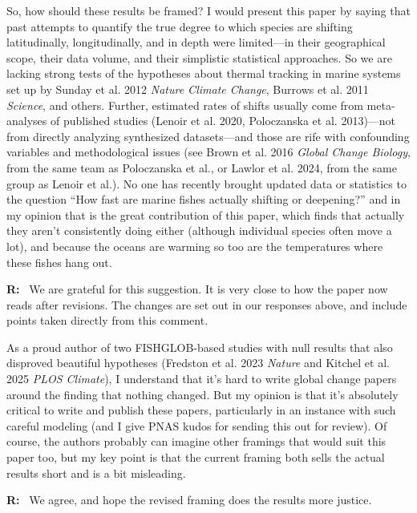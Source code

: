 \documentclass[11pt]{article}
\newcommand{\reviewer}[1]{\par\medskip\noindent\textcolor{revcolor}{#1}\par}
\newenvironment{reply}
{\par\smallskip\begingroup\color{replycolor}\noindent\textbf{R:}\ }
{\endgroup\par\medskip}
\begin{document}
\reviewer{So, how should these results be framed? I would present this paper by saying that past attempts to quantify the true degree to which species are shifting latitudinally, longitudinally, and in depth were limited---in their geographical scope, their data volume, and their simplistic statistical approaches. So we are lacking strong tests of the hypotheses about thermal tracking in marine systems set up by Sunday et al. 2012 \textit{Nature Climate Change}, Burrows et al. 2011
\textit{Science}, and others. Further, estimated rates of shifts usually come from meta-analyses of published studies (Lenoir et al. 2020, Poloczanska et al. 2013)---not from directly analyzing synthesized datasets---and those are rife with confounding variables and methodological issues (see Brown et al. 2016
\textit{Global Change Biology}, from the same team as Poloczanska et al., or Lawlor et al. 2024, from the same group as Lenoir et al.). No one has recently brought updated data or statistics to the question ``How fast are marine fishes actually shifting or deepening?'' and in my opinion that is the great contribution of this paper, which finds that actually they aren't consistently doing either (although individual species often move a lot), and because the oceans are warming so too are the temperatures where these fishes hang out.}

\begin{reply}
We are grateful for this suggestion. It is very close to how the paper now reads after revisions. The changes are set out in our responses above, and include points taken directly from this comment.
\end{reply}

\reviewer{As a proud author of two FISHGLOB-based studies with null results that also disproved beautiful hypotheses (Fredston et al. 2023 \textit{Nature} and Kitchel et al. 2025 \textit{PLOS Climate}), I understand that it's hard to write global change papers around the finding that nothing changed. But my opinion is that it's absolutely critical to write and publish these papers, particularly in an instance with such careful modeling (and I give PNAS kudos for sending this out for review). Of course, the authors probably can imagine other framings that would suit this paper too, but my key point is that the current framing both sells the actual results short and is a bit misleading.}

\begin{reply}
We agree, and hope the revised framing does the results more justice.  
\end{reply}
\end{document}
